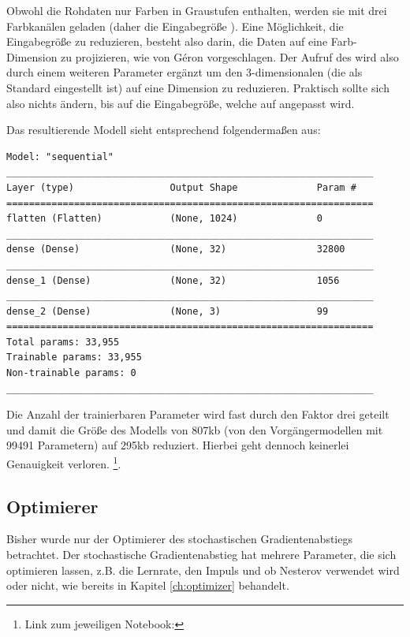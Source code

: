 Obwohl die Rohdaten nur Farben in Graustufen enthalten, werden sie mit drei Farbkanälen geladen (daher die Eingabegröße \code{[32, 32, 3]}).
Eine Möglichkeit, die Eingabegröße zu reduzieren, besteht also darin, die Daten auf eine Farb-Dimension zu projizieren, wie von Géron \cite[S.215]{Geron2019} vorgeschlagen.
Der Aufruf des  wird also durch einem weiteren Parameter  ergänzt um den 3-dimensionalen  (die als Standard eingestellt ist) auf eine Dimension zu reduzieren.
Praktisch sollte sich also nichts ändern, bis auf die Eingabegröße, welche auf \code{[32, 32, 1]} angepasst wird.

Das resultierende Modell sieht entsprechend folgendermaßen aus:

\begin{lstlisting}
Model: "sequential"
_________________________________________________________________
Layer (type)                 Output Shape              Param #   
=================================================================
flatten (Flatten)            (None, 1024)              0         
_________________________________________________________________
dense (Dense)                (None, 32)                32800     
_________________________________________________________________
dense_1 (Dense)              (None, 32)                1056      
_________________________________________________________________
dense_2 (Dense)              (None, 3)                 99        
=================================================================
Total params: 33,955
Trainable params: 33,955
Non-trainable params: 0
_________________________________________________________________
\end{lstlisting}

Die Anzahl der trainierbaren Parameter wird fast durch den Faktor drei geteilt und damit die Größe des Modells von 807kb (von den Vorgängermodellen mit 99491 Parametern) auf 295kb reduziert.
Hierbei geht dennoch keinerlei Genauigkeit verloren. \footnote{Link zum jeweiligen Notebook: }.

\subsection{Optimierer}

Bisher wurde nur der Optimierer des stochastischen Gradientenabstiegs betrachtet.
Der stochastische Gradientenabstieg hat mehrere Parameter, die sich optimieren lassen, z.B. die Lernrate, den Impuls und ob Nesterov verwendet wird oder nicht, wie bereits in Kapitel \ref{ch:optimizer} behandelt.


